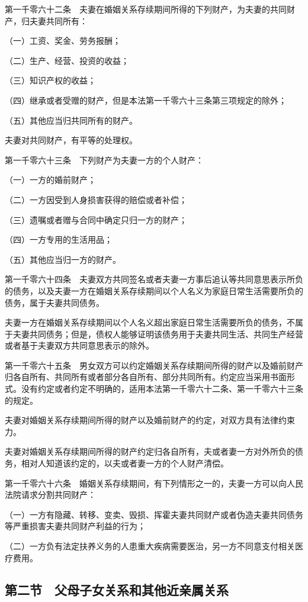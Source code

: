 \documentclass[UTF8,12pt,a4paper]{ctexbook}
\begin{document}
第一千零六十二条　夫妻在婚姻关系存续期间所得的下列财产，为夫妻的共同财产，归夫妻共同所有：

（一）工资、奖金、劳务报酬；

（二）生产、经营、投资的收益；

（三）知识产权的收益；

（四）继承或者受赠的财产，但是本法第一千零六十三条第三项规定的除外；

（五）其他应当归共同所有的财产。

夫妻对共同财产，有平等的处理权。

第一千零六十三条　下列财产为夫妻一方的个人财产：

（一）一方的婚前财产；

（二）一方因受到人身损害获得的赔偿或者补偿；

（三）遗嘱或者赠与合同中确定只归一方的财产；

（四）一方专用的生活用品；

（五）其他应当归一方的财产。

第一千零六十四条　夫妻双方共同签名或者夫妻一方事后追认等共同意思表示所负的债务，以及夫妻一方在婚姻关系存续期间以个人名义为家庭日常生活需要所负的债务，属于夫妻共同债务。

夫妻一方在婚姻关系存续期间以个人名义超出家庭日常生活需要所负的债务，不属于夫妻共同债务；但是，债权人能够证明该债务用于夫妻共同生活、共同生产经营或者基于夫妻双方共同意思表示的除外。

第一千零六十五条　男女双方可以约定婚姻关系存续期间所得的财产以及婚前财产归各自所有、共同所有或者部分各自所有、部分共同所有。约定应当采用书面形式。没有约定或者约定不明确的，适用本法第一千零六十二条、第一千零六十三条的规定。

夫妻对婚姻关系存续期间所得的财产以及婚前财产的约定，对双方具有法律约束力。

夫妻对婚姻关系存续期间所得的财产约定归各自所有，夫或者妻一方对外所负的债务，相对人知道该约定的，以夫或者妻一方的个人财产清偿。

第一千零六十六条　婚姻关系存续期间，有下列情形之一的，夫妻一方可以向人民法院请求分割共同财产：

（一）一方有隐藏、转移、变卖、毁损、挥霍夫妻共同财产或者伪造夫妻共同债务等严重损害夫妻共同财产利益的行为；

（二）一方负有法定扶养义务的人患重大疾病需要医治，另一方不同意支付相关医疗费用。


\subsection*{第二节　父母子女关系和其他近亲属关系}
\end{document}
